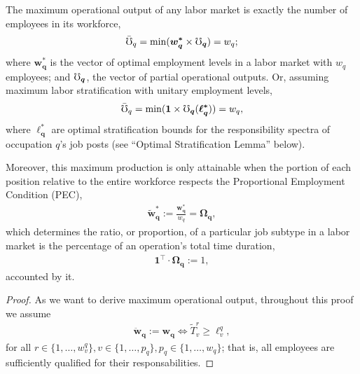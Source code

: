\documentclass[hidelinks, nonatbib]{elsarticle}
\begin{document}
\begin{lemma}
    The maximum operational output of any labor market is exactly the number of employees in its workforce,
    \begin{gather}
        \bar{\mho}_{q}
        =
        \min(
            \boldsymbol{w_{q}^{*}}
            \times
            \boldsymbol{\mho_q}
        )
        = w_q
        ;
    \end{gather}
    where $\boldsymbol{w_{q}^{*}}$ is the vector of optimal employment levels in a labor market with $w_q$ employees; and $\boldsymbol{\mho_q}$, the vector of partial operational outputs. Or, assuming maximum labor stratification with unitary employment levels,
    \begin{gather}
        \bar{\mho}_{q}
        =
        \min(
            \boldsymbol{1}
            \times
            \boldsymbol{\mho_q}(
                \boldsymbol{\ell_{q}^{*}}
            )
        )
        = w_q
        ,
    \end{gather}
    where $\boldsymbol{\ell_{q}^{*}}$ are optimal stratification bounds for the responsibility spectra of occupation $q$'s job posts (see ``Optimal Stratification Lemma'' below).
    
    Moreover, this maximum production is only attainable when the portion of each position relative to the entire workforce respects the Proportional Employment Condition (PEC),
    \begin{gather}
        \boldsymbol{\tilde{w}_{q}^{*}}
        :=
        \frac{
            \boldsymbol{w_{q}^{*}}
        }{
            w_q
        }
        =
        \boldsymbol{\Omega_{q}}
        ,
    \end{gather}
    which determines the ratio, or proportion, of a particular job subtype in a labor market is the percentage of an operation's total time duration,
    \begin{gather}
        \boldsymbol{1} ^ {\top}
        \cdot
        \boldsymbol{\Omega_{q}}
        := 1
        ,
    \end{gather}
    accounted by it.
    
    \begin{proof}
        As we want to derive maximum operational output, throughout this proof we assume
        \begin{gather}
            \boldsymbol{\ddot{w}_{q}}
            :=
            \boldsymbol{w_q}
            \iff
            \tilde{T}_{v}^{r}
            \geq
            \ell_{v}^{q}
            ,
        \end{gather}
        for all $
        r \in \{1, \dots, w_{v}^{q}\}
        ,
        v \in \{1, \dots, p_q\}
        ,
        p_q \in \{1, \dots, w_q\}
        $; that is, all employees are sufficiently qualified for their responsabilities.
        

\end{proof}
\end{lemma}
\end{document}
